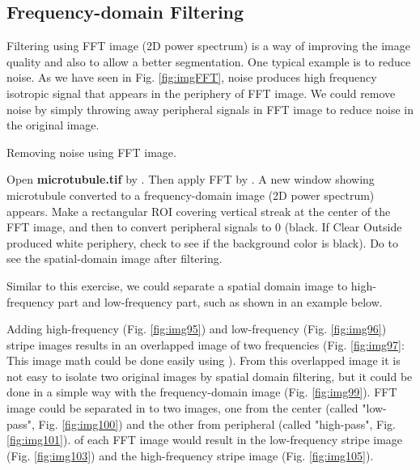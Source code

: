 \subsection{Frequency-domain Filtering}

Filtering using FFT image (2D power spectrum) is a way of improving the image quality and
also to allow a better segmentation. One typical example is to reduce noise. As we have seen in Fig. \ref{fig:imgFFT}, noise produces high frequency
isotropic signal that appears in the periphery of FFT image. We
could remove noise by simply throwing away peripheral signals in FFT
image to reduce noise in the original image. 

\begin{indentexercise}{1} Removing noise using FFT image. 

Open \textbf{microtubule.tif} by . Then apply FFT
by . A new
window showing microtubule converted to a frequency-domain image (2D power spectrum) appears. Make
a rectangular ROI covering vertical streak at the center of the FFT
image, and then  to
convert peripheral signals to 0 (black. If Clear Outside produced white
periphery, check  to
see if the background color is black). Do  to see the spatial-domain image after
filtering.
\end{indentexercise}

Similar to this exercise, we could separate a spatial domain image to high-frequency part
and low-frequency part, such as shown
in an example below.
 
Adding high-frequency (Fig. \ref{fig:img95}) and low-frequency (Fig. \ref{fig:img96}) stripe images 
results in an overlapped image of two frequencies (Fig. \ref{fig:img97}: This image math could be done
easily using  ). From this overlapped image it is not easy
to isolate two original images by spatial domain filtering, but
it could be done in a simple way with the frequency-domain image (Fig. \ref{fig:img99}). 
FFT image could be separated in to two images, one from the center (called "low-pass", Fig. \ref{fig:img100}) 
and the other from peripheral (called "high-pass",  Fig. \ref{fig:img101}). 
 of each FFT image would result in the low-frequency stripe image  (Fig. \ref{fig:img103}) and
the high-frequency stripe image (Fig. \ref{fig:img105}).


